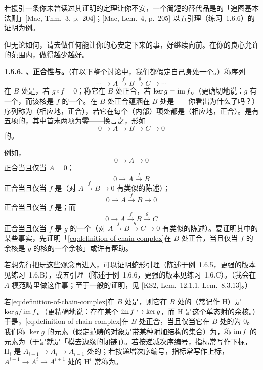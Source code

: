 若援引一条你未曾读过其证明的定理让你不安，一个简短的替代品是\trMacLane{}的「追图基本法则」[Mac, Thm.~3, p.~204]；[Mac, Lem.~4, p.~205] 以五引理（练习~1.6.6）的证明为例。

但无论如何，请去做任何能让你的心安定下来的事，好继续向前。在你的良心允许的范围内，做得越少越好。

\textbf{1.5.6. \trComplexes、正合性与\trHomology。}\quad （在以下整个讨论中，我们都假定自己身处一个\trAbelianCategory。）称序列
\begin{equation*}\tag{1.5.6.1}\label{eq:definition-of-chain-complex}
\cdots\longrightarrow A \mathrel{\xrightarrow{\ f\ }} B \mathrel{\xrightarrow{\ g\ }} C\longrightarrow\cdots
\end{equation*}
在 $B$ 处是\trComplexN，若 $g\circ f=0$；称它在 $B$ 处正合，若 $\ker g=\operatorname{im} f$。（更确切地说：$g$ 有一个\trKernel，而该核是 $f$ 的一个\trImage。在 $B$ 处正合蕴涵在 $B$ 处是\trComplexN{}——你看出为什么了吗？）序列称为\trComplexN（相应地，正合），若它在每个（内部）项处都是\trComplexN（相应地，正合）。\trShortExactSequence{}是有五项的\trExactSequence，其中首末两项为零——换言之，形如
\[
0\longrightarrow A\longrightarrow B\longrightarrow C\longrightarrow 0
\]
的\trExactSequence。

例如，
\[
0\longrightarrow A\longrightarrow 0
\]
正合当且仅当 $A=0$；
\[
0\longrightarrow A\mathrel{\xrightarrow{\ f\ }}B
\]
正合当且仅当 $f$ 是\trMonomorphism（对 $A\mathrel{\xrightarrow{\ f\ }}B\to 0$ 有类似的陈述）；
\[
0\longrightarrow A\mathrel{\xrightarrow{\ f\ }}B\longrightarrow 0
\]
正合当且仅当 $f$ 是\trIsomorphism；而
\[
0\longrightarrow A\mathrel{\xrightarrow{\ f\ }}B\mathrel{\xrightarrow{\ g\ }}C
\]
正合当且仅当 $f$ 是 $g$ 的一个\trKernel（对 $A\mathrel{\xrightarrow{\ f\ }}B\mathrel{\xrightarrow{\ g\ }}C\to 0$ 有类似的陈述）。要证明其中的某些事实，先证明「\eqref{eq:definition-of-chain-complex}在 $B$ 处正合，当且仅当 $f$ 的余核是 $g$ 的核的一个余核」或许有帮助。

若想先行把玩这些观念再进入\trHomology，可以证明蛇形引理（陈述于例~1.6.5，更强的版本见练习~1.6.B），或五引理（陈述于例~1.6.6，更强的版本见练习~1.6.C）。（我会在 $A$-模范畴里做这件事；至于一般的证明，见 [KS2, Lem.~12.1.1, Lem.~8.3.13]。）

若\eqref{eq:definition-of-chain-complex}在 $B$ 处是\trComplexN，则它在 $B$ 处的\trHomology（常记作 $\mathrm{H}$）是 $\ker g/\operatorname{im} f$。（更精确地说：存在某个\trMonomorphism{} $\operatorname{im} f\hookrightarrow\ker g$，而 $\mathrm{H}$ 是这个单态射的余核。）于是，\eqref{eq:definition-of-chain-complex}在 $B$ 处正合，当且仅当它在 $B$ 处的\trHomology{}为 $0$。我们称 $\ker g$ 的元素（假定范畴的对象是带某种附加结构的集合）为\trCycles，称 $\operatorname{im} f$ 的元素为\trBoundaries（于是\trHomology{}就是「模去边缘的闭链」）。若\trComplexN{}按递减次序编号，指标常写作下标，$\mathrm{H}_i$ 是 $A_{i+1}\to A_i\to A_{i-1}$ 处的\trHomology；若\trComplexN{}按递增次序编号，指标常写作上标，$A^{i-1}\to A^{i}\to A^{i+1}$ 处的\trHomology{} $\mathrm{H}^i$ 常称为\trCohomology。

